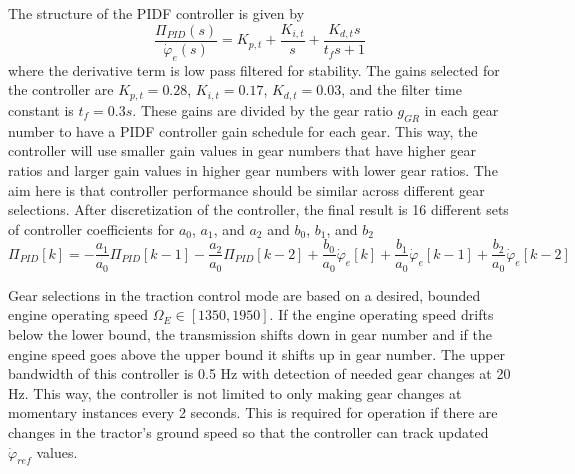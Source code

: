 The structure of the PIDF controller is given by
\begin{equation}
    \frac{\Pi_{PID}(s)}{\dot{\varphi}_e(s)} = K_{p,t} + \frac{K_{i,t}}{s} + \frac{K_{d,t}s}{t_fs+1}
\end{equation}
where the derivative term is low pass filtered for stability. The gains selected for the controller are $K_{p,t}=0.28$, $K_{i,t}=0.17$, $K_{d,t}=0.03$, and the filter time constant is $t_f=0.3s$. These gains are divided by the gear ratio $g_{GR}$ in each gear number to have a PIDF controller gain schedule for each gear. This way, the controller will use smaller gain values in gear numbers that have higher gear ratios and larger gain values in higher gear numbers with lower gear ratios. The aim here is that controller performance should be similar across different gear selections. After discretization of the controller, the final result is 16 different sets of controller coefficients for $a_0$, $a_1$, and $a_2$ and $b_0$, $b_1$, and $b_2$
\begin{equation}
    \Pi_{PID}[k] = -\frac{a_1}{a_0}\Pi_{PID}[k-1] -\frac{a_2}{a_0}\Pi_{PID}[k-2]  + \frac{b_0}{a_0}\dot{\varphi}_e[k] + \frac{b_1}{a_0}\dot{\varphi}_e[k-1] + \frac{b_2}{a_0}\dot{\varphi}_e[k-2]
\end{equation}

Gear selections in the traction control mode are based on a desired, bounded engine operating speed $\Omega_E \in [1350,1950]$. If the engine operating speed drifts below the lower bound, the transmission shifts down in gear number and if the engine speed goes above the upper bound it shifts up in gear number. The upper bandwidth of this controller is 0.5 Hz with detection of needed gear changes at 20 Hz. This way, the controller is not limited to only making gear changes at momentary instances every 2 seconds. This is required for operation if there are changes in the tractor's ground speed so that the controller can track updated $\dot{\varphi}_{ref}$ values. 